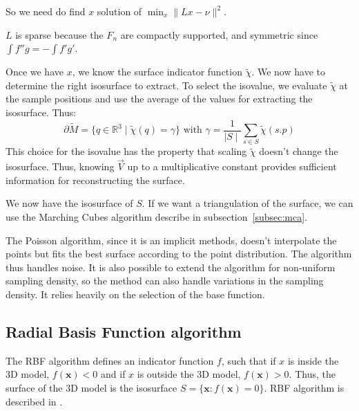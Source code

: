\documentclass[12pt]{article}
\begin{document}
So we need do find $x$ solution of $\min_{x}\|Lx - \nu\|^2$.

$L$ is sparse because the $F_n$ are compactly supported, and symmetric since $\int f''g = -\int f'g'$.

Once we have $x$, we know the surface indicator function $\tilde{\chi}$. We now have to determine the right isosurface to extract. To select the isovalue, we evaluate $\tilde{\chi}$ at the sample positions and use the average of the values for extracting the isosurface. Thus:
$$\partial\tilde{M} = \{q \in \mathbb{R}^3 \mid \tilde{\chi}(q) = \gamma\} \text{ with } \gamma = \frac{1}{\mid S\mid}\sum_{s \in S}\tilde{\chi}(s.p)$$
This choice for the isovalue has the property that scaling $\tilde{\chi}$ doesn't change the isosurface. Thus, knowing $\vec{V}$ up to a multiplicative constant provides sufficient information for reconstructing the surface.

We now have the isosurface of $S$. If we want a triangulation of the surface, we can use the Marching Cubes algorithm describe in subsection~\ref{subsec:mca}.

The Poisson algorithm, since it is an implicit methods, doesn't interpolate the points but fits the best surface according to the point distribution. The algorithm thus handles noise. It is also possible to extend the algorithm for non-uniform sampling density, so the method can also handle variations in the sampling density. It relies heavily on the selection of the base function.

\subsection{Radial Basis Function algorithm}
The RBF algorithm defines an indicator function $f$, such that if $x$ is inside the 3D model, $f(\boldsymbol{x}) < 0$ and if $x$ is outside the 3D model, $f(\boldsymbol{x}) > 0$. Thus, the surface of the 3D model is the isosurface $S = \{\boldsymbol{x}: f(\boldsymbol{x}) =0\}$. RBF algorithm is described in \cite{RBF1}.
\end{document}
